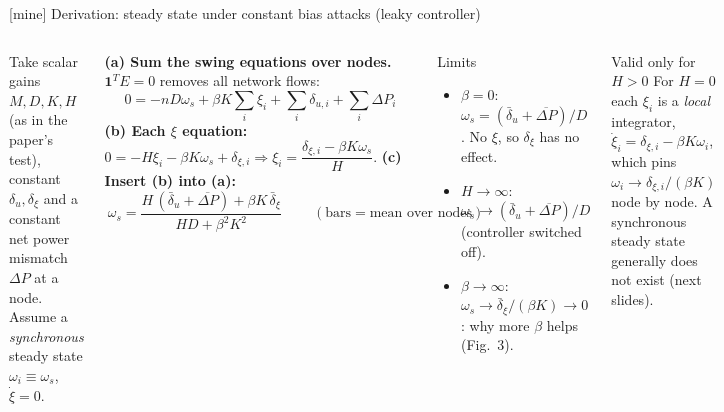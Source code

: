 \documentclass[aspectratio=169,9pt]{beamer}
\newcommand{\ones}{\mathbf{1}}
\begin{document}
\begin{frame}[t]{[mine] Derivation: steady state under constant bias attacks (leaky controller)}
\footnotesize
\begin{columns}[T]
Take scalar gains $M,D,K,H$ (as in the paper's test), constant $\delta_u,\delta_\xi$ and a constant net power mismatch $\Delta P$ at a node. Assume a \emph{synchronous} steady state $\omega_i\equiv\omega_s$, $\dot\xi=0$.
\medskip

\textbf{(a) Sum the swing equations over nodes.} $\ones^TE=0$ removes all network flows:
\[0=-nD\omega_s+\beta K\textstyle\sum_i\xi_i+\sum_i\delta_{u,i}+\sum_i\Delta P_i\]
\textbf{(b) Each $\xi$ equation:} $0=-H\xi_i-\beta K\omega_s+\delta_{\xi,i}\Rightarrow\xi_i=\dfrac{\delta_{\xi,i}-\beta K\omega_s}{H}$.
\textbf{(c) Insert (b) into (a):}
\[\boxed{\ \omega_s=\frac{H\,(\bar\delta_u+\overline{\Delta P})+\beta K\,\bar\delta_\xi}{HD+\beta^2K^2}\ }\qquad(\text{bars}=\text{mean over nodes})\]
\begin{block}{Limits}
\begin{itemize}
\item $\beta=0$: $\omega_s=(\bar\delta_u+\overline{\Delta P})/D$. No $\xi$, so $\delta_\xi$ has no effect.
\item $H\to\infty$: $\omega_s\to(\bar\delta_u+\overline{\Delta P})/D$ (controller switched off).
\item $\beta\to\infty$: $\omega_s\to\bar\delta_\xi/(\beta K)\to0$: why more $\beta$ helps (Fig.~3).
\end{itemize}
\end{block}
\begin{alertblock}{Valid only for $H>0$}
For $H=0$ each $\xi_i$ is a \emph{local} integrator, $\dot\xi_i=\delta_{\xi,i}-\beta K\omega_i$, which pins $\omega_i\to\delta_{\xi,i}/(\beta K)$ node by node. A synchronous steady state generally does not exist (next slides).
\end{alertblock}
\end{columns}
\end{frame}
\end{document}
